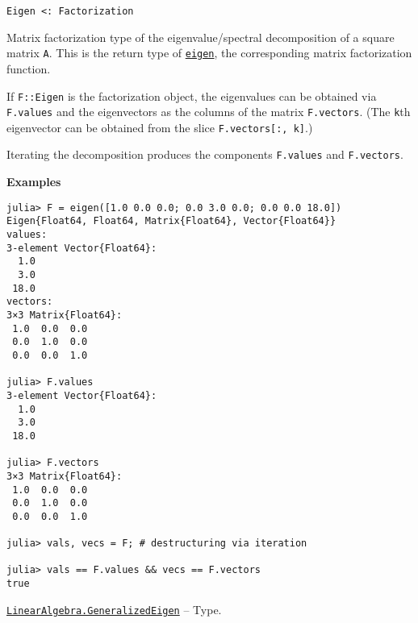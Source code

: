 \begin{adjustwidth}{2em}{0pt}


\begin{verbatim}
Eigen <: Factorization
\end{verbatim}

Matrix factorization type of the eigenvalue/spectral decomposition of a square matrix \texttt{A}. This is the return type of \hyperlink{11056016707394839114}{\texttt{eigen}}, the corresponding matrix factorization function.

If \texttt{F::Eigen} is the factorization object, the eigenvalues can be obtained via \texttt{F.values} and the eigenvectors as the columns of the matrix \texttt{F.vectors}. (The \texttt{k}th eigenvector can be obtained from the slice \texttt{F.vectors[:, k]}.)

Iterating the decomposition produces the components \texttt{F.values} and \texttt{F.vectors}.

\textbf{Examples}


\begin{verbatim}
julia> F = eigen([1.0 0.0 0.0; 0.0 3.0 0.0; 0.0 0.0 18.0])
Eigen{Float64, Float64, Matrix{Float64}, Vector{Float64}}
values:
3-element Vector{Float64}:
  1.0
  3.0
 18.0
vectors:
3×3 Matrix{Float64}:
 1.0  0.0  0.0
 0.0  1.0  0.0
 0.0  0.0  1.0

julia> F.values
3-element Vector{Float64}:
  1.0
  3.0
 18.0

julia> F.vectors
3×3 Matrix{Float64}:
 1.0  0.0  0.0
 0.0  1.0  0.0
 0.0  0.0  1.0

julia> vals, vecs = F; # destructuring via iteration

julia> vals == F.values && vecs == F.vectors
true
\end{verbatim}



\end{adjustwidth}
\hypertarget{6969744257762628976}{}
\hyperlink{6969744257762628976}{\texttt{LinearAlgebra.GeneralizedEigen}}  -- {Type.}

